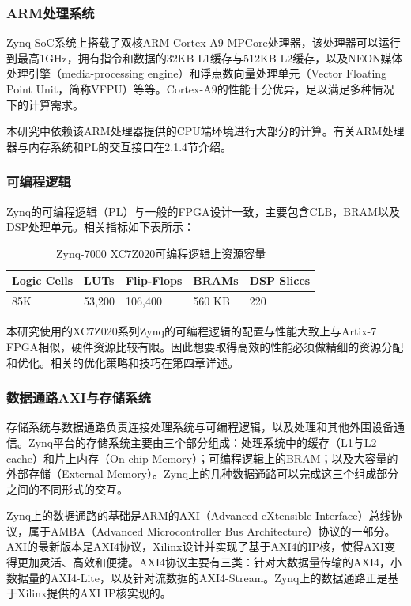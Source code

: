 \subsubsection{ARM处理系统}

Zynq SoC系统上搭载了双核ARM Cortex-A9 MPCore处理器，该处理器可以运行到最高1GHz，拥有指令和数据的32KB L1缓存与512KB L2缓存，以及NEON媒体处理引擎（media-processing engine）和浮点数向量处理单元（Vector Floating Point Unit，简称VFPU）等等。Cortex-A9的性能十分优异，足以满足多种情况下的计算需求。

本研究中依赖该ARM处理器提供的CPU端环境进行大部分的计算。有关ARM处理器与内存系统和PL的交互接口在2.1.4节介绍。

\subsubsection{可编程逻辑}

Zynq的可编程逻辑（PL）与一般的FPGA设计一致，主要包含CLB，BRAM以及DSP处理单元。相关指标如下表所示：

\begin{table}[!ht]
\centering
\begin{tabular}{ | l | l | l | l | l | }
\hline
Logic Cells & LUTs & Flip-Flops & BRAMs & DSP Slices \\ \hline
85K & 53,200 & 106,400 & 560 KB & 220 \\
\hline
\end{tabular}
\caption{Zynq-7000 XC7Z020可编程逻辑上资源容量}
\end{table}

本研究使用的XC7Z020系列Zynq的可编程逻辑的配置与性能大致上与Artix-7 FPGA相似，硬件资源比较有限。因此想要取得高效的性能必须做精细的资源分配和优化。相关的优化策略和技巧在第四章详述。

\subsubsection{数据通路AXI与存储系统}

存储系统与数据通路负责连接处理系统与可编程逻辑，以及处理和其他外围设备通信。Zynq平台的存储系统主要由三个部分组成：处理系统中的缓存（L1与L2 cache）和片上内存（On-chip Memory）；可编程逻辑上的BRAM；以及大容量的外部存储（External Memory）。Zynq上的几种数据通路可以完成这三个组成部分之间的不同形式的交互。

Zynq上的数据通路的基础是ARM的AXI（Advanced eXtensible Interface）\supercite{ug761}总线协议，属于AMBA（Advanced Microcontroller Bus Architecture）协议的一部分。
AXI的最新版本是AXI4协议，Xilinx设计并实现了基于AXI4的IP核，使得AXI变得更加灵活、高效和便捷。AXI4协议主要有三类：针对大数据量传输的AXI4，小数据量的AXI4-Lite，以及针对流数据的AXI4-Stream。Zynq上的数据通路正是基于Xilinx提供的AXI IP核实现的。

